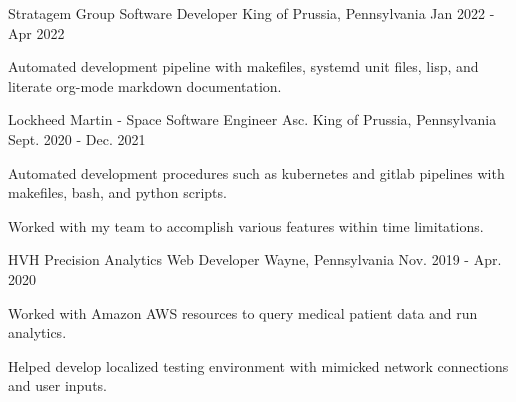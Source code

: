 \begin{cventries}


  \cventry
    {Stratagem Group} %
    {Software Developer} %
    {King of Prussia, Pennsylvania} %
    {Jan 2022 - Apr 2022} %
    {
      \begin{cvitems} %
        \item {Automated development pipeline with makefiles, systemd unit files, lisp, and literate org-mode markdown documentation.}
      \end{cvitems}
    }


  \cventry
    {Lockheed Martin - Space} %
    {Software Engineer Asc.} %
    {King of Prussia, Pennsylvania} %
    {Sept. 2020 - Dec. 2021} %
    {
      \begin{cvitems} %
        \item {Automated development procedures such as kubernetes and gitlab pipelines with makefiles, bash, and python scripts.}
        \item {Worked with my team to accomplish various features within time limitations.}
      \end{cvitems}
    }

  \cventry
    {HVH Precision Analytics} %
    {Web Developer} %
    {Wayne, Pennsylvania} %
    {Nov. 2019 - Apr. 2020} %
    {
      \begin{cvitems} %
        \item {Worked with Amazon AWS resources to query medical patient data and run analytics.}
        \item {Helped develop localized testing environment with mimicked network connections and user inputs.}
      \end{cvitems}
    }


\end{cventries}
